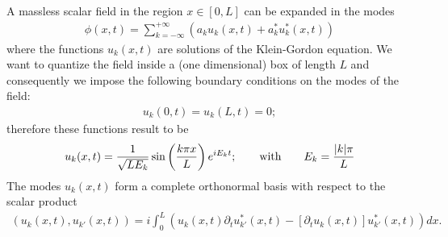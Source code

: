 \documentclass[10pt, nofootinbib]{revtex4}
\newcommand{\bea}{\begin{eqnarray}}
\newcommand{\eea}{\end{eqnarray}}
\begin{document}
A massless scalar field in the region $x\in[0,L]$ can be expanded in
the modes
%
\bea \phi(x,t)= \sum_{k=-\infty}^{+\infty} \left( a_k u_k(x,t) +a_k^*
u_k^*(x,t) \right) \eea
%
where the functions $u_k(x,t)$ are solutions of the Klein-Gordon
equation.  We want to quantize the field inside a (one dimensional)
box of length $L$ and consequently we impose the following boundary
conditions on the modes of the field:
%
\bea u_k(0,t)=u_k(L,t)=0; \eea
%
therefore these functions result to be
%
\bea u_k(x,t) = \frac{1}{\sqrt{L E_k}} \sin \left( \frac{k \pi x}{L}
\right) e^{i E_k t}; \qquad \hbox{with} \qquad E_k = \frac{|k| \pi}{L}
\eea
%
The modes $u_k(x,t)$ form a complete orthonormal basis with respect to
the scalar product
%
\bea \left( u_k(x,t),u_{k'}(x,t) \right) = i \int_0 ^L \left( u_k(x,t)
\partial_t u^* _{k'}(x,t) - [ \partial_t u_k(x,t)]u^* _{k'}(x,t)
\right) dx.  \eea
%
\end{document}
